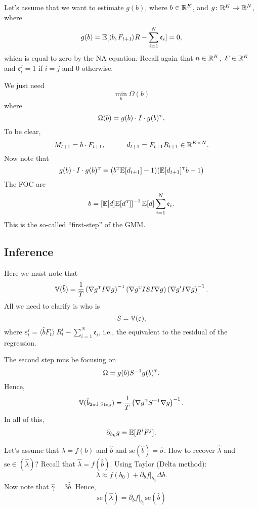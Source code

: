 \renewcommand{\t}{\text{\tiny T}}
\newcommand{\se}{\text{se}}
Let's assume that we want to estimate $g(b)$, where $b\in\mathbb{R}^K$, and $g\colon\mathbb{R}^K\to\mathbb{R}^N$, where
$$	
	g(b) = \mathbb{E}[\langle b, F_{t+1}\rangle R - \sum_{i=1}^N\mathfrak{e}_i] = 0,
$$	
whicn is equal to zero by the NA equation. Recall again that $n\in\mathbb{R}^K$, $F\in\mathbb{R}^K$ and $\mathfrak{e}_i^j = 1$ if $i=j$ and $0$ otherwise.

We just need
$$
	\min_b \Omega(b) 
$$ 
where
$$	
	\Omega(b) = g(b) \cdot I \cdot g(b)^\t.
$$
To be clear,
$$
	M_{t+1} = b\cdot F_{t+1}, \quad\quad\quad  d_{t+1} = F_{t+1}R_{t+1}\in\mathbb{R}^{K\times N}.
$$
Now note that
$$
	 g(b) \cdot I \cdot g(b)^\t = (b^\t\E[d_{t+1}] - 1)(\E[d_{t+1}]^\t b -1)
$$
The FOC are
$$
	b = \left[\E[d]\E[d^\t]\right]^{-1}\E[d]\sum_{i=1}^N\mathfrak{e}_i.
$$
This is the so-called ``first-step'' of the GMM. 

\subsection{Inference}

Here we must note that
$$
	\V(\hat{b}) = \frac{1}{T}\left(\nabla g^\t I \nabla g\right)^{-1}\left(\nabla g^\t I S I \nabla g\right)\left(\nabla g' I \nabla g\right)^{-1}.
$$
All we need to clarify is who is
$$
	S = \mathbb{V}(\varepsilon), 
$$
where $\varepsilon^i_t = \langle\hat{b} F_t\rangle \ R_t^i -\sum_{i=1}^N\mathfrak{e}_i$, i.e., the equivalent to the residual of the regression.

The second step mus be focusing on
$$
	\Omega = g(b) S^{-1} g(b)^\t.
$$
Hence,
$$
	\V(\hat{b}_{\text{2nd Step}}) = \frac{1}{T}\left(\nabla g^\t S^{-1}\nabla g\right)^{-1}.
$$
In all of this,
$$
	\partial_{b_k} g = \mathbb{E}[R^i F^j].
$$

Let's assume that $\lambda = f(b)$ and $\hat{b}$ and $\text{se}(\hat{b}) = \hat{\sigma}$. How to recover $\hat{\lambda}$ and $\text{se}\in(\hat{\lambda})$? Recall that $\hat{\lambda} = f(\hat{b})$. Using Taylor (Delta method):
$$
	\lambda\approx f(b_0) + \partial_{b}f\big|_{b_0} \Delta b.
$$
Now note that $\hat{\gamma} = 3\hat{b}$. Hence,
$$
	\se(\hat{\lambda}) = \partial_b f\big|_{b_0}\se(\hat{b})
$$